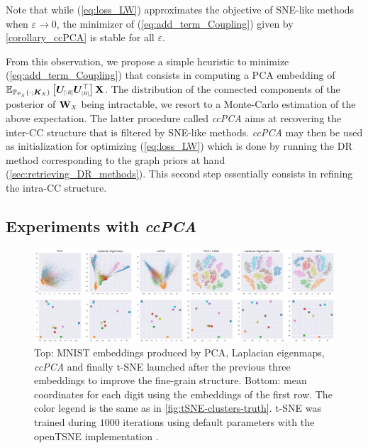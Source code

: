 \begin{remark}
Note that while (\ref{eq:loss_LW}) approximates the objective of SNE-like methods when $\varepsilon \to 0$, the minimizer of (\ref{eq:add_term_Coupling}) given by \cref{corollary_ccPCA} is stable for all $\varepsilon$.
\end{remark}

From this observation, we propose a simple heuristic to minimize (\ref{eq:add_term_Coupling}) that consists in computing a PCA embedding of $\mathbb{E}_{\mathbb{P}_{\scaleto{\mathcal{P}_X}{4pt}}(\cdot;\bm{K}_{\scaleto{X}{3pt}})}\left[ \bm{U}_{\scaleto{[:R]}{5pt}}\bm{U}_{\scaleto{[R]}{5pt}}^\top \right]\Xb$. The distribution of the connected components of the posterior of $\Wb_{\scaleto{X}{4pt}}$ being intractable, we resort to a Monte-Carlo estimation of the above expectation. The latter procedure called \textit{ccPCA} aims at recovering the inter-CC structure that is filtered by SNE-like methods. \textit{ccPCA} may then be used as initialization for optimizing (\ref{eq:loss_LW}) which is done by running the DR method corresponding to the graph priors at hand (\cref{sec:retrieving_DR_methods}). This second step essentially consists in refining the intra-CC structure. 

\subsection{Experiments with \textit{ccPCA}}\label{sec:ccPCA}

\begin{figure}[t]
\begin{center}
\centerline{\includegraphics[width=\columnwidth]{Figures/cluster_positions.pdf}}
\caption{Top: MNIST embeddings produced by PCA, Laplacian eigenmaps, \textit{ccPCA} and finally t-SNE launched after the previous three embeddings to improve the fine-grain structure. Bottom: mean coordinates for each digit using the embeddings of the first row. The color legend is the same as in \cref{fig:tSNE-clusters-truth}. t-SNE was trained during $1000$ iterations using default parameters with the openTSNE implementation \cite{polivcar2019opentsne}.}
\label{fig:methods_embeddings}
\end{center}
\vspace{-0.8cm}
\end{figure}

